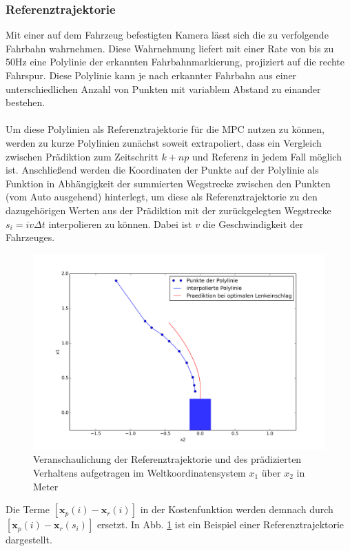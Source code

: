 \subsubsection{Referenztrajektorie}
Mit einer auf dem Fahrzeug befestigten Kamera lässt sich die zu verfolgende Fahrbahn wahrnehmen. Diese Wahrnehmung liefert mit einer Rate von bis zu 50Hz eine Polylinie der erkannten Fahrbahnmarkierung, projiziert auf die rechte Fahrspur. Diese Polylinie kann je nach erkannter Fahrbahn aus einer unterschiedlichen Anzahl von Punkten mit variablem Abstand zu einander bestehen.\\ \\
Um diese Polylinien als Referenztrajektorie für die MPC nutzen zu können, werden zu kurze Polylinien zunächst soweit extrapoliert, dass ein Vergleich zwischen Prädiktion zum Zeitschritt $k+np$ und Referenz in jedem Fall möglich ist. Anschließend werden die Koordinaten der Punkte auf der Polylinie als Funktion in Abhängigkeit der summierten Wegstrecke zwischen den Punkten (vom Auto ausgehend) hinterlegt, um diese als Referenztrajektorie zu den dazugehörigen Werten aus der Prädiktion mit der zurückgelegten Wegstrecke $s_i = iv\Delta t$ interpolieren zu können. Dabei ist $v$ die Geschwindigkeit der Fahrzeuges. 
\begin{figure}[t]
\centering
\includegraphics[scale=0.53]{Bilder/Reference.png}
\caption{Veranschaulichung der Referenztrajektorie und des prädizierten Verhaltens aufgetragen im Weltkoordinatensystem $x_1$ über $x_2$ in Meter}
\label{fig:referenz}
\end{figure}
Die Terme $\left [\boldsymbol{x}_{p}(i)-\boldsymbol{x}_{r}(i)\right ]$ in der Kostenfunktion werden demnach durch $\left [\boldsymbol{x}_{p}(i)-\boldsymbol{x}_{r}(s_i)\right ]$ ersetzt. In Abb. \ref{fig:referenz} ist ein Beispiel einer Referenztrajektorie dargestellt.\\ \\
